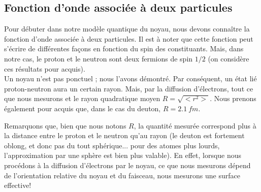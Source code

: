 \subsection{Fonction d'onde associée à deux particules}


Pour débuter dans notre modèle quantique du noyau, nous devons connaître la fonction d'onde associée à deux particules. Il est à noter que cette fonction peut s'écrire de différentes façons en fonction du spin des constituants. Mais, dans notre cas, le proton et le neutron sont deux fermions de spin $1/2$ (on considère ces résultats pour acquis).\\

Un noyau n'est pas ponctuel ; nous l'avons démontré. Par conséquent, un état lié proton-neutron aura un certain rayon. Mais, par la diffusion d'électrons, tout ce que nous mesurons et le rayon quadratique moyen $R = \sqrt{<r^2>}$. Nous prenons également pour acquis que, dans le cas du deuton, $R= \SI{2.1}{fm}$.

Remarquons que, bien que nous notons $R$, la quantité mesurée correspond plus à la distance entre le proton et le neutron qu'au rayon (le deuton est fortement oblong, et donc pas du tout sphérique... pour des atomes plus lourds, l'approximation par une sphère est bien plus valable). En effet, lorsque nous procédons à la diffusion d'électrons par le noyau, ce que nous mesurons dépend de l'orientation relative du noyau et du faisceau, nous mesurons une surface effective!

